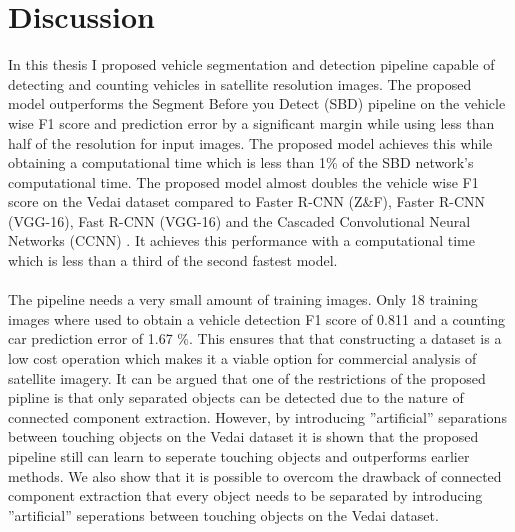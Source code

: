 \documentclass{kththesis}
\begin{document}
\chapter{Discussion}
In this thesis I proposed vehicle segmentation and detection pipeline capable of detecting and counting vehicles in satellite resolution images. The proposed model outperforms the Segment Before you Detect (SBD) pipeline \parencite{audebert_usability_2016} on the vehicle wise F1 score and prediction error by a significant margin while using less than half of the resolution for input images. The proposed model achieves this while obtaining a computational time which is less than 1\% of the SBD network's computational time. The proposed model almost doubles the vehicle wise F1 score on the Vedai dataset compared to Faster R-CNN (Z\&F), Faster R-CNN (VGG-16), Fast R-CNN (VGG-16) \parencite{zeiler_visualizing_2014} and the Cascaded Convolutional Neural Networks (CCNN) \parencite{zhong_robust_2017-1}. It achieves this performance with a computational time which is less than a third of the second fastest model.\\
\\
The pipeline needs a very small amount of training images. Only 18 training images where used to obtain a vehicle detection F1 score of 0.811 and a counting car prediction error of 1.67 \%. This  ensures that that constructing a dataset is a low cost operation which makes it a viable option for commercial analysis of satellite imagery. It can be argued that one of the restrictions of the proposed pipline is that only separated objects can be detected due to the nature of connected component extraction. However, by introducing ''artificial'' separations between touching objects on the Vedai dataset it is shown that the proposed pipeline still can learn to seperate touching objects and outperforms earlier methods. We also show that it is possible to overcom the drawback of connected component extraction that every object needs to be separated by introducing ''artificial'' seperations between touching objects on the Vedai dataset. 
\printbibliography[heading=bibintoc] %

\appendix
%
\end{document}
